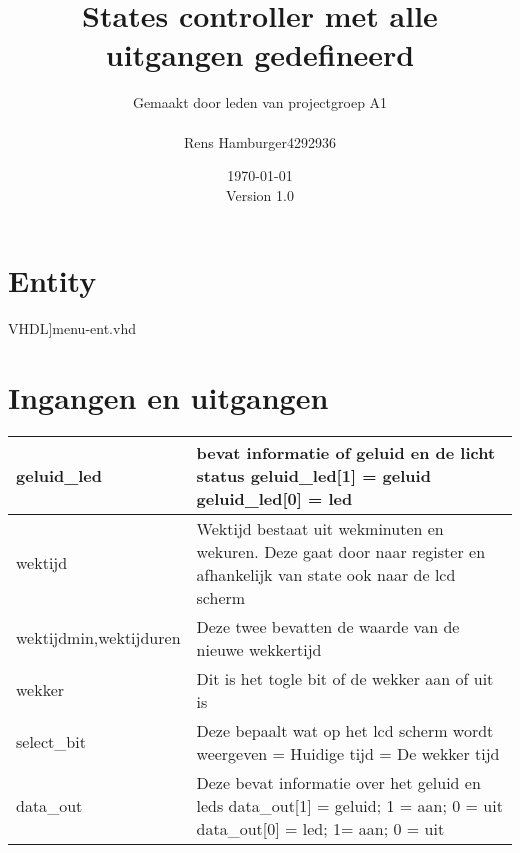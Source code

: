 \documentclass[a4paper, oneside, 10pt]{article}
\title{\textbf{States controller met alle uitgangen gedefineerd}}
\author{
Gemaakt door leden van projectgroep A1\\
\begin{tabular}{c | l}
Rens Hamburger & 4292936 \\
\end{tabular}
}
\date{\today\\ Version 1.0}
\begin{document}
\maketitle

\newpage
\section{Entity}
\scriptsize 
  VHDL]{menu-ent.vhd}
 \normalsize
\section{Ingangen en uitgangen}
\begin{tabular}{|l|p{10cm}|}
\hline
geluid{\_}led & bevat informatie of geluid en de licht status \newline
geluid{\_}led[1] = geluid \newline
geluid{\_}led[0] = led  \\ \hline
wektijd & Wektijd bestaat uit wekminuten en wekuren.
Deze gaat door naar register en afhankelijk van state ook naar de lcd scherm \\ \hline
wektijdmin,wektijduren & Deze twee bevatten de waarde van de nieuwe wekkertijd \\ \hline
wekker & Dit is het togle bit of de wekker aan of uit is \\ \hline
select{\_}bit & Deze bepaalt wat op het lcd scherm wordt weergeven \newline
1 = Huidige tijd \newline
0 = De wekker tijd \\ \hline
data{\_}out & Deze bevat informatie over het geluid en leds \newline
data{\_}out[1] = geluid; 1 = aan; 0 = uit \newline
data{\_}out[0] = led; 1= aan; 0 = uit \\ \hline
\end{tabular}
\end{document}
